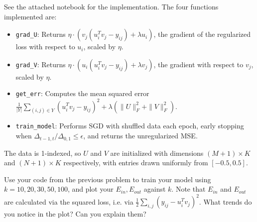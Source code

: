 \begin{solution}
See the attached notebook for the implementation. The four functions implemented are:

\begin{itemize}
\item \texttt{grad\_U}: Returns $\eta \cdot \left( v_j (u_i^T v_j - y_{ij}) + \lambda u_i \right)$, the gradient of the regularized loss with respect to $u_i$, scaled by $\eta$.

\item \texttt{grad\_V}: Returns $\eta \cdot \left( u_i (u_i^T v_j - y_{ij}) + \lambda v_j \right)$, the gradient with respect to $v_j$, scaled by $\eta$.

\item \texttt{get\_err}: Computes the mean squared error $\frac{1}{|Y|} \sum_{(i,j) \in Y} (u_i^T v_j - y_{ij})^2 + \lambda (\|U\|_F^2 + \|V\|_F^2)$.

\item \texttt{train\_model}: Performs SGD with shuffled data each epoch, early stopping when $\Delta_{t-1,t} / \Delta_{0,1} \leq \epsilon$, and returns the unregularized MSE.
\end{itemize}

The data is 1-indexed, so $U$ and $V$ are initialized with dimensions $(M+1) \times K$ and $(N+1) \times K$ respectively, with entries drawn uniformly from $[-0.5, 0.5]$.
\end{solution}

\problem[5]
Use your code from the previous problem to train your model using $k=10, 20, 30, 50, 100$, and plot your $E_{in}, E_{out}$ against $k$. Note that $E_{in}$ and $E_{out}$ are calculated via the squared loss, i.e. via $\frac{1}{2}\sum_{i,j} \left( y_{ij} - u_i^Tv_j\right)^2$. What trends do you notice in the plot? Can you explain them?

